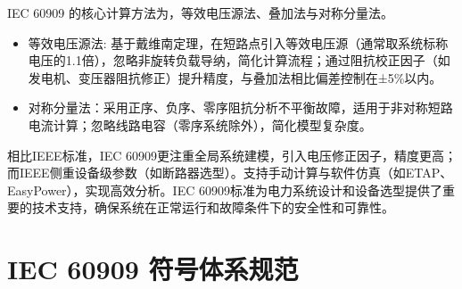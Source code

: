 \documentclass[a4paper,11pt,AutoFakeBold]{ctexart}
\begin{document}
IEC 60909 的核心计算方法为，等效电压源法、叠加法与对称分量法。
\begin{itemize}
    \item 等效电压源法: 基于戴维南定理，在短路点引入等效电压源（通常取系统标称电压的1.1倍），忽略非旋转负载导纳，简化计算流程；通过阻抗校正因子（如发电机、变压器阻抗修正）提升精度，与叠加法相比偏差控制在±5\%以内。
    \item 对称分量法：采用正序、负序、零序阻抗分析不平衡故障，适用于非对称短路电流计算；忽略线路电容（零序系统除外），简化模型复杂度。
\end{itemize}


相比IEEE标准，IEC 60909更注重全局系统建模，引入电压修正因子，精度更高；而IEEE侧重设备级参数（如断路器选型）。支持手动计算与软件仿真（如ETAP、EasyPower），实现高效分析。IEC 60909标准为电力系统设计和设备选型提供了重要的技术支持，确保系统在正常运行和故障条件下的安全性和可靠性。

\newpage


\newpage
\section{IEC 60909 符号体系规范}
\end{document}
